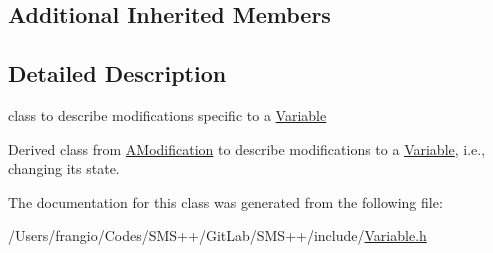 \subsection*{Additional Inherited Members}


\subsection{Detailed Description}
class to describe modifications specific to a \mbox{\hyperlink{class_s_m_spp__di__unipi__it_1_1_variable}{Variable}} 

Derived class from \mbox{\hyperlink{class_s_m_spp__di__unipi__it_1_1_a_modification}{A\+Modification}} to describe modifications to a \mbox{\hyperlink{class_s_m_spp__di__unipi__it_1_1_variable}{Variable}}, i.\+e., changing its state. 

The documentation for this class was generated from the following file\+:\begin{DoxyCompactItemize}
\item 
/\+Users/frangio/\+Codes/\+S\+M\+S++/\+Git\+Lab/\+S\+M\+S++/include/\mbox{\hyperlink{_variable_8h}{Variable.\+h}}\end{DoxyCompactItemize}
